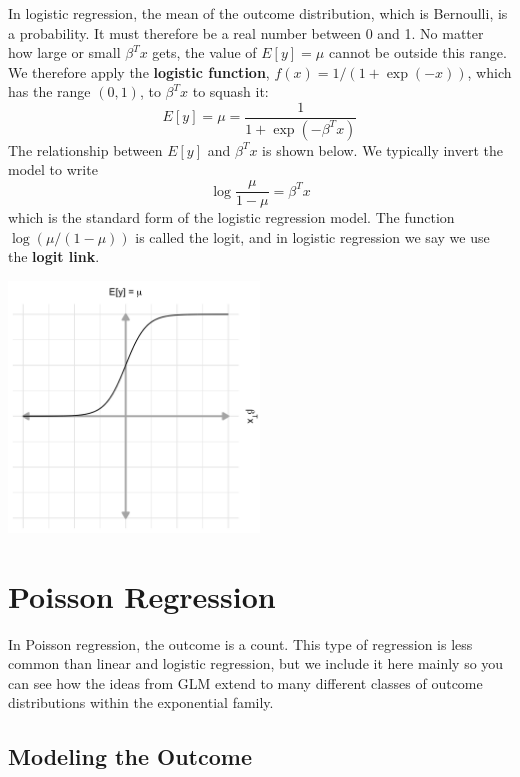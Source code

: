 In logistic regression, the mean of the outcome distribution, which is Bernoulli, is a probability. It must therefore be a real number between 0 and 1. No matter how large or small $\beta^T x$ gets, the value of $E[y] = \mu$ cannot be outside this range. We therefore apply the \textbf{logistic function}, $f(x) = 1/(1 + \exp(-x))$, which has the range $(0, 1)$, to $\beta^T x$ to squash it:
\begin{equation} E[y] = \mu = \frac{1}{1 + \exp{(-\beta^Tx)}} \label{eqn:meanlogistic} \end{equation}
The relationship between $E[y]$ and $\beta^T x$ is shown below. We typically invert the model to write
$$ \log{\frac{\mu}{1-\mu}} = \beta^T x $$
which is the standard form of the logistic regression model. The function $\log \left( \mu/(1-\mu) \right)$ is called the logit, and in logistic regression we say we use the \textbf{logit link}.

\begin{center}
\includegraphics[width=0.5\textwidth]{img/l02-figure2-logistic.png}
\end{center}


\section{Poisson Regression}

In Poisson regression, the outcome is a count. This type of regression is less common than linear and logistic regression, but we include it here mainly so you can see how the ideas from GLM extend to many different classes of outcome distributions within the exponential family.  

\subsection{Modeling the Outcome}

